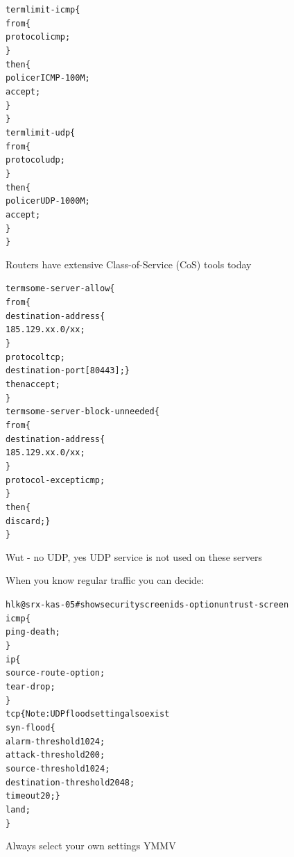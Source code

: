 \documentclass[Screen16to9,17pt]{foils}
\begin{document}

\begin{alltt}\footnotesize
term limit-icmp \{
    from \{
        protocol icmp;
    \}
    then \{
        policer ICMP-100M;
        accept;
    \}
\}
term limit-udp \{
    from \{
        protocol udp;
    \}
    then \{
        policer UDP-1000M;
        accept;
    \}
\}
\end{alltt}

Routers have extensive Class-of-Service (CoS) tools today


\begin{alltt}\footnotesize
term some-server-allow \{
    from \{
        destination-address \{
            185.129.xx.0/xx;
        \}
        protocol tcp;
        destination-port [ 80 443 ];    \}
    then accept;
\}
term some-server-block-unneeded \{
    from \{
        destination-address \{
            185.129.xx.0/xx;
        \}
        protocol-except icmp;
    \}
    then \{
        discard;    \}
\}
\end{alltt}

Wut - no UDP, yes UDP service is not used on these servers



When you know regular traffic you can decide:

\begin{alltt}\footnotesize
hlk@srx-kas-05# show security screen ids-option untrust-screen
icmp \{
    ping-death;
\}
ip \{
    source-route-option;
    tear-drop;
\}
tcp \{    Note: UDP flood setting also exist
    syn-flood \{
        alarm-threshold 1024;
        attack-threshold 200;
        source-threshold 1024;
        destination-threshold 2048;
        timeout 20;    \}
    land;
\}
\end{alltt}

Always select your own settings YMMV
\end{document}

